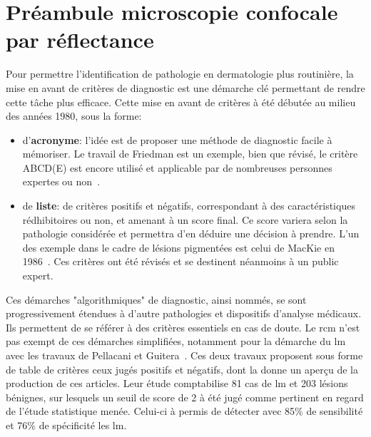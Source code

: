 \chapter*{Préambule microscopie confocale par réflectance}
\mtcaddchapter 
\label{chap:preamble_microscopy}
Pour permettre l'identification de pathologie en dermatologie plus routinière, la mise en avant de critères de diagnostic est une démarche clé permettant de rendre cette tâche plus efficace. Cette mise en avant de critères à été débutée au milieu des années 1980, sous la forme:
\begin{itemize}
    \item d'\textbf{acronyme}: l'idée est de proposer une méthode de diagnostic facile à mémoriser. Le travail de Friedman est un exemple, bien que révisé, le critère ABCD(E) est encore utilisé et applicable par de nombreuses personnes expertes ou non~\cite{Friedman1985}.
    \item de \textbf{liste}: de critères positifs et négatifs, correspondant à des caractéristiques rédhibitoires ou non, et amenant à un score final. Ce score variera selon la pathologie considérée et permettra d'en déduire une décision à prendre. L'un des exemple dans le cadre de lésions pigmentées est celui de MacKie en 1986~\cite{mackie1986}. Ces critères ont été révisés et se destinent néanmoins à un public expert. 
\end{itemize}\par

Ces démarches "algorithmiques" de diagnostic, ainsi nommés, se sont progressivement étendues à d'autre pathologies et dispositifs d'analyse médicaux. Ils permettent de se référer à des critères essentiels en cas de doute. Le \gls{rcm} n'est pas exempt de ces démarches simplifiées, notamment pour la démarche du \gls{lm} avec les travaux de Pellacani et Guitera~\cite{Pellacani2007, Guitera2010}. Ces deux travaux proposent sous forme de table de critères ceux jugés positifs et négatifs, dont la  donne un aperçu de la production de ces articles. Leur étude comptabilise 81 cas de \gls{lm} et 203 lésions bénignes, sur lesquels un seuil de score de 2 à été jugé comme pertinent en regard de l'étude statistique menée. Celui-ci à permis de détecter avec 85\% de sensibilité et 76\% de spécificité les \gls{lm}.\par

